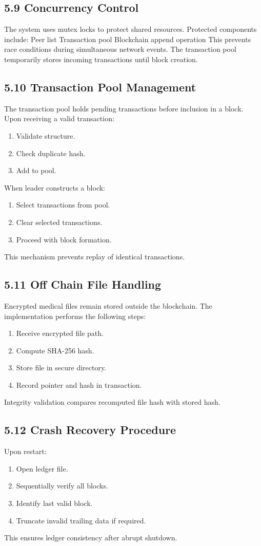 \subsection*{5.9 Concurrency Control}
The system uses mutex locks to protect shared resources.
Protected components include:
Peer list
Transaction pool
Blockchain append operation
This prevents race conditions during simultaneous network events.
The transaction pool temporarily stores incoming transactions until block creation.
\subsection*{5.10 Transaction Pool Management}

The transaction pool holds pending transactions before inclusion in a block.
Upon receiving a valid transaction:
\begin{enumerate}
\item Validate structure.
\item Check duplicate hash.
\item Add to pool.
\end{enumerate}
When leader constructs a block:
\begin{enumerate}
\item Select transactions from pool.
\item Clear selected transactions.
\item Proceed with block formation.
\end{enumerate}
This mechanism prevents replay of identical transactions.

\subsection*{5.11 Off Chain File Handling}
Encrypted medical files remain stored outside the blockchain.
The implementation performs the following steps:
\begin{enumerate}
\item Receive encrypted file path.
\item Compute SHA-256 hash.
\item Store file in secure directory.
\item Record pointer and hash in transaction.
\end{enumerate}
Integrity validation compares recomputed file hash with stored hash.

\subsection*{5.12 Crash Recovery Procedure}
Upon restart:
\begin{enumerate}
\item Open ledger file.
\item Sequentially verify all blocks.
\item Identify last valid block.
\item Truncate invalid trailing data if required.
\end{enumerate}
This ensures ledger consistency after abrupt shutdown.

